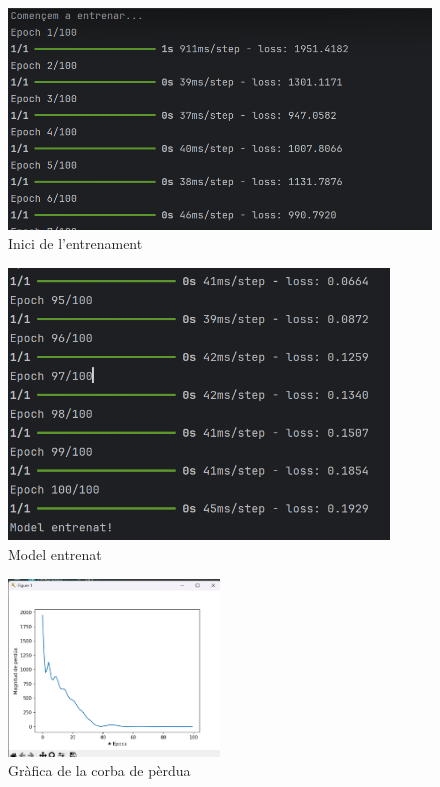 \begin{minipage}{0.45\textwidth}
  \begin{figure}[H]
  \centering
  \includegraphics[width=1\textwidth]{./figures/10.png}
  \caption{Inici de l’entrenament}
  \end{figure}
\end{minipage}
\begin{minipage}{0.45\textwidth}
\begin{figure}[H]
\centering
\includegraphics[width=0.9\textwidth]{./figures/11.png}
\caption{Model entrenat}
\end{figure}
\end{minipage}

\begin{figure}[H]
\centering
\includegraphics[width=0.5\textwidth]{./figures/12.png}
\caption{Gràfica de la corba de pèrdua}
\end{figure}

